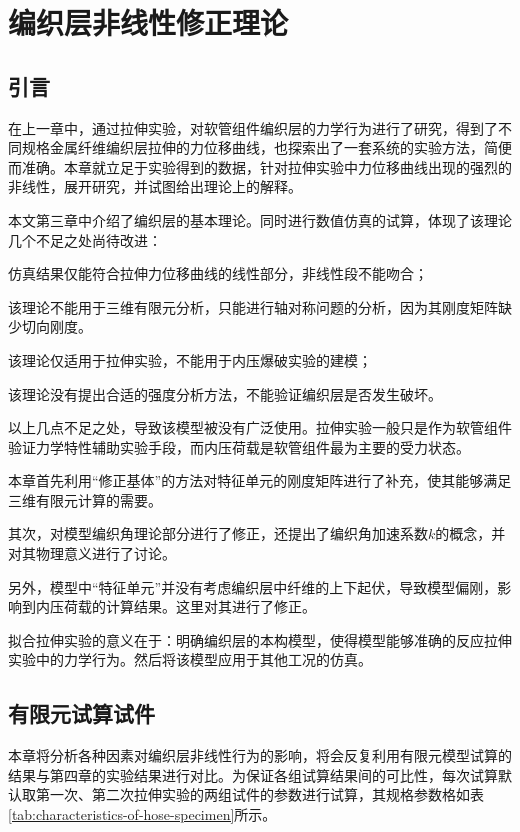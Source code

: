 
\chapter{编织层非线性修正理论}


\section{引言}

在上一章中，通过拉伸实验，对软管组件编织层的力学行为进行了研究，得到了不同规格金属纤维编织层拉伸的力位移曲线，也探索出了一套系统的实验方法，简便而准确。本章就立足于实验得到的数据，针对拉伸实验中力位移曲线出现的强烈的非线性，展开研究，并试图给出理论上的解释。


本文第三章中介绍了\ha 编织层的基本理论。同时进行数值仿真的试算，体现了该理论几个不足之处尚待改进：
\begin{compactitem}
	\item 仿真结果仅能符合拉伸力位移曲线的线性部分，非线性段不能吻合；
	\item 该理论不能用于三维有限元分析，只能进行轴对称问题的分析，因为其刚度矩阵缺少切向刚度。
	\item 该理论仅适用于拉伸实验，不能用于内压爆破实验的建模；
	\item 该理论没有提出合适的强度分析方法，不能验证编织层是否发生破坏。
\end{compactitem}

以上几点不足之处，导致该模型被没有广泛使用。拉伸实验一般只是作为软管组件验证力学特性辅助实验手段，而内压荷载是软管组件最为主要的受力状态。


本章首先利用“修正基体”的方法对特征单元的刚度矩阵进行了补充，使其能够满足三维有限元计算的需要。

其次，对\ha 模型编织角理论部分进行了修正，还提出了编织角加速系数$ k $的概念，并对其物理意义进行了讨论。

另外，\ha 模型中“特征单元”并没有考虑编织层中纤维的上下起伏，导致模型偏刚，影响到内压荷载的计算结果。这里对其进行了修正。

拟合拉伸实验的意义在于：明确编织层的本构模型，使得模型能够准确的反应拉伸实验中的力学行为。然后将该模型应用于其他工况的仿真。

\newpage



\section{有限元试算试件}
本章将分析各种因素对编织层非线性行为的影响，将会反复利用有限元模型试算的结果与第四章的实验结果进行对比。为保证各组试算结果间的可比性，每次试算默认取第一次、第二次拉伸实验的两组试件的参数进行试算，其规格参数格如表\ref{tab:characteristics-of-hose-specimen}所示。


